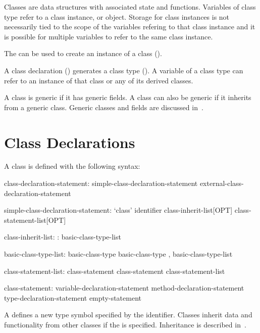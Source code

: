 \label{Classes}

Classes are data structures with associated state and functions.
Variables of class type refer to a class instance, or object. Storage for
class instances is not necessarily tied to the scope of the variables refering
to that class instance and it is possible for multiple variables to refer
to the same class instance.

The  can be used to create an instance of a class
().

A class declaration () generates a class
type ().  A variable of a class type can refer to an
instance of that class or any of its derived classes.

A class is generic if it has generic fields. A class can also
be generic if it inherits from a generic class. Generic classes and fields
are discussed in~.

\section{Class Declarations}
\label{Class_Declarations}

A class is defined with the following syntax:
\begin{syntax}
class-declaration-statement:
  simple-class-declaration-statement
  external-class-declaration-statement

simple-class-declaration-statement:
  `class' identifier class-inherit-list[OPT] { class-statement-list[OPT] }

class-inherit-list:
  : basic-class-type-list

basic-class-type-list:
  basic-class-type
  basic-class-type , basic-class-type-list

class-statement-list:
  class-statement
  class-statement class-statement-list

class-statement:
  variable-declaration-statement
  method-declaration-statement
  type-declaration-statement
  empty-statement
\end{syntax}

A  defines a new type symbol
specified by the identifier.  Classes inherit data and functionality
from other classes %
if the  is specified.
Inheritance is described in~.

